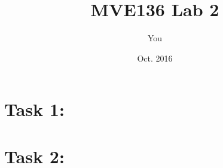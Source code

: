 \documentclass{article}
\title{MVE136 Lab 2}
\author{You}
\date{Oct. 2016}
\begin{document}
\maketitle

\section{Task 1:}



\section{Task 2:}



\end{document}
